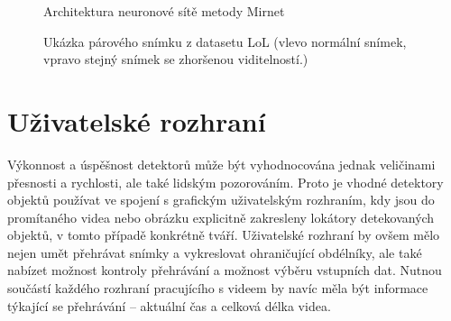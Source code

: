 \begin{figure}[H]
  \begin{center}
  \label{obrazek:mirnet}
  \caption{Architektura neuronové sítě metody Mirnet}
  \end{center}
\end{figure}


\begin{figure}[H]
  \begin{center}
  \label{obrazek:loldataset}
  \caption{Ukázka párového snímku z datasetu LoL (vlevo normální snímek, vpravo stejný snímek se zhoršenou viditelností.)}
  \end{center}
\end{figure}
 
\section{Uživatelské rozhraní}
Výkonnost a úspěšnost detektorů může být vyhodnocována jednak veličinami přesnosti a rychlosti, ale také lidským pozorováním. Proto je vhodné detektory objektů používat ve spojení s grafickým uživatelským rozhraním, kdy jsou do promítaného videa nebo obrázku explicitně zakresleny lokátory detekovaných objektů, v tomto případě konkrétně tváří. Uživatelské rozhraní by ovšem mělo nejen umět přehrávat snímky a vykreslovat ohraničující obdélníky, ale také nabízet možnost kontroly přehrávání a možnost výběru vstupních dat. Nutnou součástí každého rozhraní pracujícího s videem by navíc měla být informace týkající se přehrávání -- aktuální čas a celková délka videa.

